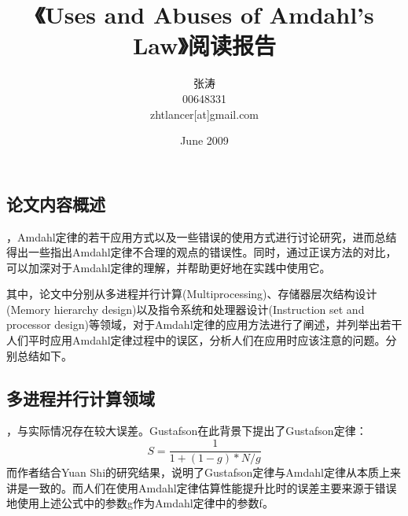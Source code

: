 \documentclass[a4paper,12pt]{article}
\begin{document}
\begin{CJK*}{UTF8}{song}
	
	\newcommand{\chuhao}{\fontsize{42pt}{\baselineskip}\selectfont}
	\newcommand{\xiaochuhao}{\fontsize{36pt}{\baselineskip}\selectfont}
	\newcommand{\yihao}{\fontsize{28pt}{\baselineskip}\selectfont}
	\newcommand{\erhao}{\fontsize{21pt}{\baselineskip}\selectfont}
	\newcommand{\xiaoerhao}{\fontsize{18pt}{\baselineskip}\selectfont}
	\newcommand{\sanhao}{\fontsize{15.75pt}{\baselineskip}\selectfont}
	\newcommand{\sihao}{\fontsize{14pt}{\baselineskip}\selectfont}
	\newcommand{\xiaosihao}{\fontsize{12pt}{1.3\baselineskip}\selectfont}
	\newcommand{\wuhao}{\fontsize{10.5pt}{1.3\baselineskip}\selectfont}
	\newcommand{\xiaowuhao}{\fontsize{9pt}{\baselineskip}\selectfont}
	\newcommand{\liuhao}{\fontsize{7.875pt}{\baselineskip}\selectfont}
	\newcommand{\qihao}{\fontsize{5.25pt}{\baselineskip}\selectfont}

	\title{{\Large{《Uses and Abuses of Amdahl's Law》阅读报告}}}
	\author{张涛 \\ 00648331\\zhtlancer[at]gmail.com}
	\date{June 2009}
	\maketitle

	\section{\large{论文内容概述\cite{bib1}}}
	，Amdahl定律的若干应用方式以及一些错误的使用方式进行讨论研究，进而总结得出一些指出Amdahl定律不合理的观点的错误性。同时，通过正误方法的对比，可以加深对于Amdahl定律的理解，并帮助更好地在实践中使用它。

	其中，论文中分别从{多进程并行计算(Multiprocessing)}、{存储器层次结构设计(Memory hierarchy design)}以及{指令系统和处理器设计(Instruction set and processor design)}等领域，对于Amdahl定律的应用方法进行了阐述，并列举出若干人们平时应用Amdahl定律过程中的误区，分析人们在应用时应该注意的问题。分别总结如下。

		\subsection{多进程并行计算领域}
		，与实际情况存在较大误差。Gustafson在此背景下提出了Gustafson定律：\begin{displaymath}S=\frac{1}{1+(1-g)*N/g}\end{displaymath}而作者结合Yuan Shi的研究结果，说明了Gustafson定律与Amdahl定律从本质上来讲是一致的。而人们在使用Amdahl定律估算性能提升比时的误差主要来源于错误地使用上述公式中的参数g作为Amdahl定律中的参数f。


\end{CJK*}
\end{document}
